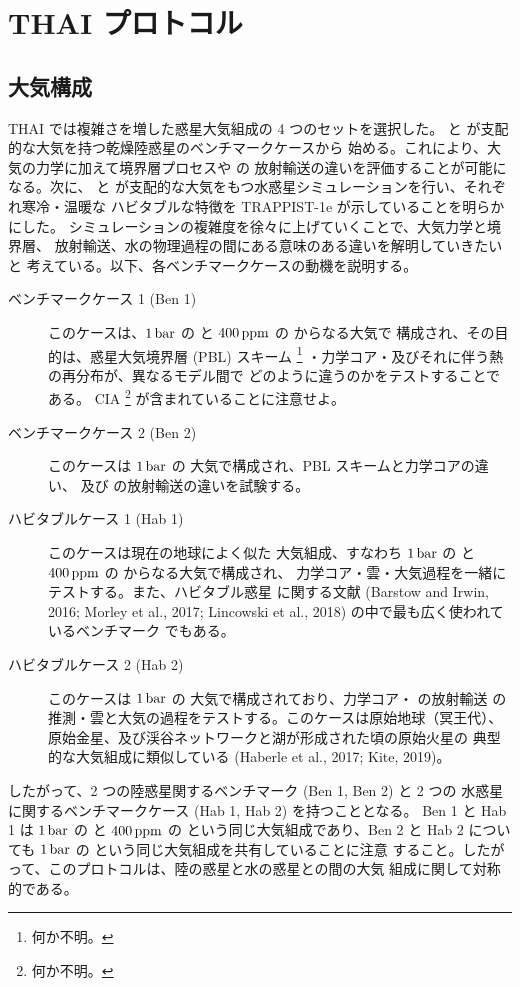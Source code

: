 \documentclass{dennou777}
\begin{document}
\section{THAI プロトコル}\label{thai}
\subsection{大気構成}\label{conf}
THAI では複雑さを増した惑星大気組成の 4 つのセットを選択した。
と  が支配的な大気を持つ乾燥陸惑星のベンチマークケースから
始める。これにより、大気の力学に加えて境界層プロセスや の
放射輸送の違いを評価することが可能になる。次に、 と 
が支配的な大気をもつ水惑星シミュレーションを行い、それぞれ寒冷・温暖な
ハビタブルな特徴を TRAPPIST-1e が示していることを明らかにした。
シミュレーションの複雑度を徐々に上げていくことで、大気力学と境界層、
放射輸送、水の物理過程の間にある意味のある違いを解明していきたいと
考えている。以下、各ベンチマークケースの動機を説明する。
\begin{description}
	\item[ベンチマークケース 1 (Ben 1)] このケースは、\(1\hmu{bar}\)
		の  と \(400\hmu{ppm}\) の  からなる大気で
		構成され、その目的は、惑星大気境界層 (PBL) スキーム%
		\footnote{何か不明。}
		・力学コア・及びそれに伴う熱の再分布が、異なるモデル間で
		どのように違うのかをテストすることである。 CIA%
		\footnote{何か不明。}
		が含まれていることに注意せよ。
	\item[ベンチマークケース 2 (Ben 2)] このケースは \(1\hmu{bar}\)
		の  大気で構成され、PBL スキームと力学コアの違い、
		及び  の放射輸送の違いを試験する。
	\item[ハビタブルケース 1 (Hab 1)] このケースは現在の地球によく似た
		大気組成、すなわち \(1\hmu{bar}\) の  と
		\(400\hmu{ppm}\) の  からなる大気で構成され、
		力学コア・雲・大気過程を一緒にテストする。また、ハビタブル惑星
		に関する文献 (Barstow and Irwin, 2016; Morley et al., 2017;
		Lincowski et al., 2018) の中で最も広く使われているベンチマーク
		でもある。
	\item[ハビタブルケース 2 (Hab 2)] このケースは \(1\hmu{bar}\)
		の  大気で構成されており、力学コア・ の放射輸送
		の推測・雲と大気の過程をテストする。このケースは原始地球（冥王代）、
		原始金星、及び渓谷ネットワークと湖が形成された頃の原始火星の
		典型的な大気組成に類似している (Haberle et al., 2017; Kite, 2019)。
\end{description}

したがって、2 つの陸惑星関するベンチマーク (Ben 1, Ben 2) と 2 つの
水惑星に関するベンチマークケース (Hab 1, Hab 2) を持つこととなる。
Ben 1 と Hab 1 は \(1\hmu{bar}\) の  と \(400\hmu{ppm}\) の
 という同じ大気組成であり、Ben 2 と Hab 2 についても
\(1\hmu{bar}\) の  という同じ大気組成を共有していることに注意
すること。したがって、このプロトコルは、陸の惑星と水の惑星との間の大気
組成に関して対称的である。
\end{document}
